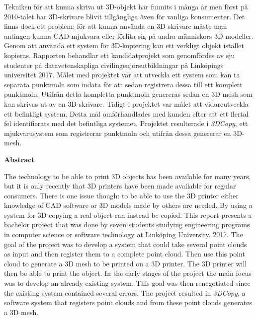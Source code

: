 \noindent
Tekniken för att kunna skriva ut 3D-objekt har funnits i många år men först på 2010-talet har 3D-skrivare blivit tillgängliga även för vanliga konsumenter. Det finns dock ett problem: för att kunna använda en 3D-skrivare måste man antingen kunna CAD-mjukvara eller förlita sig på andra människors 3D-modeller. Genom att använda ett system för 3D-kopiering kan ett verkligt objekt istället kopieras. Rapporten behandlar ett kandidatprojekt som genomfördes av sju studenter på datavetenskapliga civilingenjörsutbildningar på Linköpings universitet 2017. Målet med projektet var att utveckla ett system som kan ta separata punktmoln som indata för att sedan registrera dessa till ett komplett punktmoln. Utifrån detta kompletta punktmoln genereras sedan en 3D-mesh som kan skrivas ut av en 3D-skrivare. Tidigt i projektet var målet att vidareutveckla ett befintligt system. Detta mål omförhandlades med kunden efter att ett flertal fel identifierats med det befintliga systemet. Projektet resulterade i \textit{3DCopy}, ett mjukvarusystem som registrerar punktmoln och utifrån dessa genererar en 3D-mesh.
\bigskip

\begin{center}
\textbf{Abstract}
\end{center}

\noindent
The technology to be able to print 3D objects has been available for many years, but it is only recently that 3D printers have been made available for regular consumers. There is one issue though: to be able to use the 3D printer either knowledge of CAD software or 3D models made by others are needed. By using a system for 3D copying a real object can instead be copied. This report presents a bachelor project that was done by seven students studying engineering programs in computer science or software technology at Linköping University, 2017. The goal of the project was to develop a system that could take several point clouds as input and then register them to a complete point cloud. Then use this point cloud to generate a 3D mesh to be printed on a 3D printer. The 3D printer will then be able to print the object. In the early stages of the project the main focus was to develop an already existing system. This goal was then renegotiated since the existing system contained several errors. The project resulted in \textit{3DCopy}, a software system that registers point clouds and from these point clouds generates a 3D mesh.

\cleardoublepage

